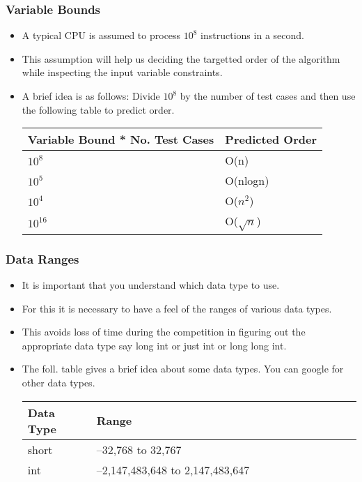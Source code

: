 \documentclass{beamer}
\begin{document}

\begin{frame}
\frametitle{Variable Bounds}
\begin{itemize}
\item A typical CPU is assumed to process $10^8$ instructions in a second.
\item This assumption will help us deciding the targetted order of the algorithm while inspecting the input variable constraints.
\item A brief idea is as follows:
Divide $10^8$ by the number of test cases and then use the following table to predict order.

\begin{table}
\begin{tabular}{l l}
\toprule
\textbf{Variable Bound * No. Test Cases} & \textbf{Predicted Order}\\
\midrule
$10^8$ & O(n)\\
$10^5$ & O(nlogn)\\
$10^4$ & O($n^2$)\\
$10^{16}$ & O($\sqrt{n}$)\\
\bottomrule
\end{tabular}
\end{table}


\end{itemize}
\end{frame}

\begin{frame}
\frametitle{Data Ranges}
\begin{itemize}
\item It is important that you understand which data type to use.
\item For this it is necessary to have a feel of the ranges of various data types.
\item This avoids loss of time during the competition in figuring out the appropriate data type say long int or just int or long long int.

\item The foll. table gives a brief idea about some data types. You can google for other data types.

\begin{table}
\begin{tabular}{l l}
\toprule
\textbf{Data Type} & \textbf{Range}\\
\midrule
short & –32,768 to 32,767\\
int &  –2,147,483,648 to 2,147,483,647\\
long long  & –9,223,372,036,854,775,808 - 9,223,372,036,854,775,807\\
\bottomrule
\end{tabular}
\end{table}
\end{itemize}
\end{frame}
\end{document}
